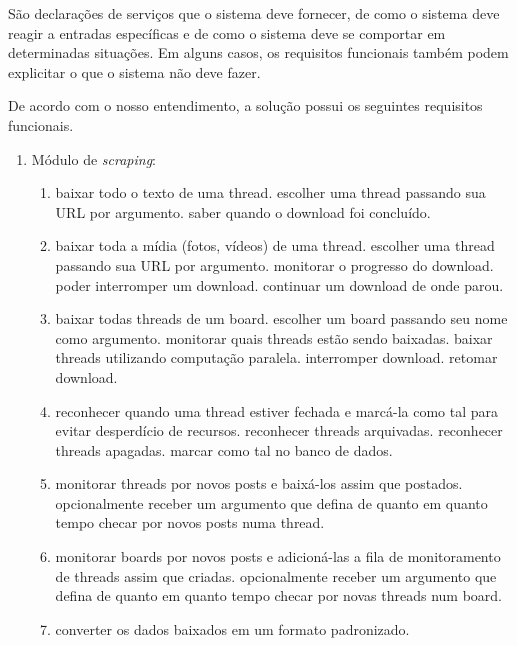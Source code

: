 \begin{directcite}
São declarações de serviços que o sistema deve fornecer,
de como o sistema deve reagir a entradas específicas e
de como o sistema deve se comportar em determinadas situações.
Em alguns casos, os requisitos funcionais também
podem explicitar o que o sistema não deve fazer.
\end{directcite}

De acordo com o nosso entendimento, a solução possui os seguintes requisitos funcionais.

\begin{enumerate}
    \item Módulo de \textit{scraping}:
    \begin{enumerate}[label*=\arabic*.]
        \item baixar todo o texto de uma thread.
            \subitem escolher uma thread passando sua URL por argumento.
            \subitem saber quando o download foi concluído.
        \item baixar toda a mídia (fotos, vídeos) de uma thread.
            \subitem escolher uma thread passando sua URL por argumento.
            \subitem monitorar o progresso do download.
            \subitem poder interromper um download.
            \subitem continuar um download de onde parou.
        \item baixar todas threads de um board.
            \subitem escolher um board passando seu nome como argumento.
            \subitem monitorar quais threads estão sendo baixadas.
            \subitem baixar threads utilizando computação paralela.
            \subitem interromper download.
            \subitem retomar download.
        \item reconhecer quando uma thread estiver fechada e marcá-la como tal para evitar desperdício de recursos.
            \subitem reconhecer threads arquivadas.
            \subitem reconhecer threads apagadas.
            \subitem marcar como tal no banco de dados.
        \item monitorar threads por novos posts e baixá-los assim que postados.
            \subitem opcionalmente receber um argumento que defina de quanto em quanto tempo checar por novos posts numa thread.
        \item monitorar boards por novos posts e adicioná-las a fila de monitoramento de threads assim que criadas.
            \subitem opcionalmente receber um argumento que defina de quanto em quanto tempo checar por novas threads num board.
        \item converter os dados baixados em um formato padronizado.

\end{enumerate}
\end{enumerate}
